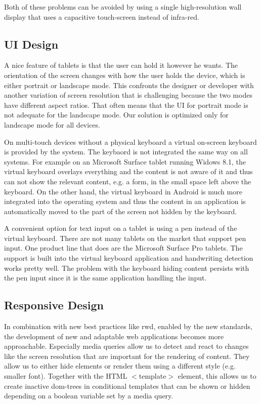 \documentclass{sigchi}
\begin{document}
Both of these problems can be avoided by using a single high-resolution wall display that uses a capacitive touch-screen instead of infra-red.

\subsection{UI Design}
A nice feature of tablets is that the user can hold it however he wants.
The orientation of the screen changes with how the user holds the device, which is either portrait or landscape mode.
This confronts the designer or developer with another variation of screen resolution that is challenging because the two modes have different aspect ratios.
That often means that the UI for portrait mode is not adequate for the landscape mode.
Our solution is optimized only for landscape mode for all devices.

On multi-touch devices without a physical keyboard a virtual on-screen keyboard is provided by the system.
The keybaord is not integrated the same way on all systems.
For example on an Microsoft Surface tablet running Widows 8.1, the virtual keyboard overlays everything and the content is not aware of it and thus can not show the relevant content, e.g. a form, in the small space left above the keyboard.
On the other hand, the virtual keyboard in Android is much more integrated into the operating system and thus the content in an application is automatically moved to the part of the screen not hidden by the keyboard.

A convenient option for text input on a tablet is using a pen instead of the virtual keyboard.
There are not many tablets on the market that support pen input.
One product line that does are the Microsoft Surface Pro tablets.
The support is built into the virtual keyboard application and handwriting detection works pretty well.
The problem with the keyboard hiding content persists with the pen input since it is the same application handling the input.

\subsection{Responsive Design}
In combination with new best practices like \gls{rwd}, enabled by the new standards, the development of new and adaptable web applications becomes more approachable.
Especially media queries allow us to detect and react to changes like the screen resolution that are important for the rendering of content.
They allow us to either hide elements or render them using a different style (e.g. smaller font).
Together with the HTML $<$template$>$ element, this allows us to create inactive \gls{dom}-trees in conditional templates that can be shown or hidden depending on a boolean variable set by a media query.
\end{document}
